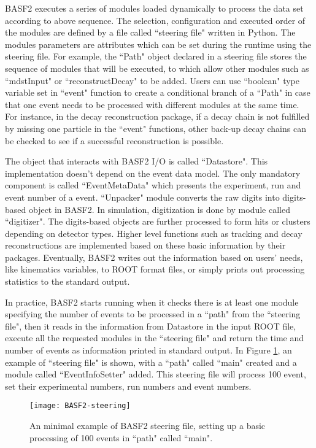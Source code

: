 BASF2 executes a series of modules loaded dynamically to process the data set according to above sequence. The selection, configuration and executed order of the modules are defined by a file called ``steering file" written in Python. The modules parameters are attributes which can be set during the runtime using the steering file. For example, the ``Path" object declared in a steering file stores the sequence of modules that will be executed, to which allow other modules such as ``mdstInput" or ``reconstructDecay" to be added.
Users can use ``boolean" type variable set in ``event" function to create a conditional branch of a ``Path" in case that one event needs to be processed with different modules at the same time. For instance, in the decay reconstruction package, if a decay chain is not fulfilled by missing one particle in the ``event" functions, other back-up decay chains can be checked to see if a successful reconstruction is possible.  

The object that interacts with BASF2 I/O is called ``Datastore". This implementation doesn't depend on the event data model. The only mandatory component is called ``EventMetaData" which presents the experiment, run  and event number of a event. ``Unpacker" module converts the raw digits into digits-based object in BASF2. In simulation, digitization is done by module called ``digitizer". The digits-based objects are further processed to form hits or clusters depending on detector types. Higher level functions such as tracking and decay reconstructions are implemented based on these basic information by their packages. Eventually, BASF2 writes out the information based on users' needs, like kinematics variables, to ROOT\cite{ROOTcern} format files, or simply prints out processing statistics to the standard output.

 In practice, BASF2 starts running when it checks there is at least one module specifying the number of events to be processed in a ``path"  from the ``steering file", then it reads in the information from Datastore in the input ROOT file, execute all the requested modules in the ``steering file" and return the time and number of events as information printed in standard output. In Figure  \ref{fig:basf2_eg}, an example of ``steering file" is shown, with a ``path" called ``main" created and a module called ``EventInfoSetter" added. This steering file will process 100 event, set their experimental numbers, run numbers and event numbers.

\begin{figure}[htbp]
	\centering
	\texttt{[image: BASF2-steering]}
	\caption{ An minimal example of BASF2 steering file, setting up a basic processing of 100 events in ``path" called ``main"\cite{Abe:2010gxa}. }
	\label{fig:basf2_eg}
\end{figure}





